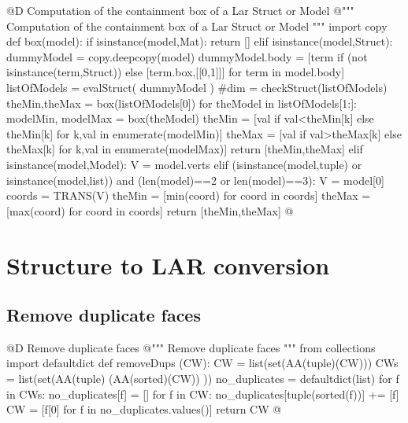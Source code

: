 \documentclass[11pt,oneside]{article}    %
\begin{document}
@D Computation of the containment box of a Lar Struct or Model
@{""" Computation of the containment box of a Lar Struct or Model """
import copy
def box(model):
    if isinstance(model,Mat): return []
    elif isinstance(model,Struct):
        dummyModel = copy.deepcopy(model)
        dummyModel.body = [term if (not isinstance(term,Struct)) else [term.box,[[0,1]]]  for term in model.body]
        listOfModels = evalStruct( dummyModel )
        #dim = checkStruct(listOfModels)
        theMin,theMax = box(listOfModels[0]) 
        for theModel in listOfModels[1:]:
            modelMin, modelMax = box(theModel)
            theMin = [val if val<theMin[k] else theMin[k] for k,val in enumerate(modelMin)]
            theMax = [val if val>theMax[k] else theMax[k] for k,val in enumerate(modelMax)]
        return [theMin,theMax]
    elif isinstance(model,Model):
        V = model.verts
    elif (isinstance(model,tuple) or isinstance(model,list)) and (len(model)==2 or len(model)==3):
        V = model[0]
    coords = TRANS(V)
    theMin = [min(coord) for coord in coords]
    theMax = [max(coord) for coord in coords]
    return [theMin,theMax]
@}


\section{Structure to LAR conversion}

\subsection{Remove duplicate faces}
@D Remove duplicate faces
@{""" Remove duplicate faces  """
from collections import defaultdict
def removeDups (CW):
    CW = list(set(AA(tuple)(CW)))
    CWs = list(set(AA(tuple)  (AA(sorted)(CW))  ))
    no_duplicates = defaultdict(list)
    for f in CWs: no_duplicates[f] = []
    for f in CW:
    	no_duplicates[tuple(sorted(f))] += [f]
    CW = [f[0] for f in no_duplicates.values()]
    return CW
@}
\end{document}
